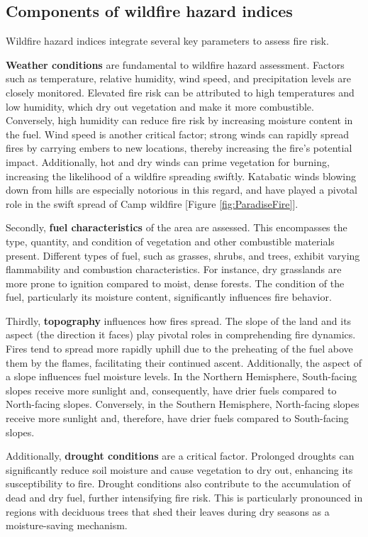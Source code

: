 \documentclass[
  12 pt,
]{Nemilov}
\begin{document}
\subsection{Components of wildfire hazard indices}\label{components-of-wildfire-hazard-indices}

Wildfire hazard indices integrate several key parameters to assess fire risk.

\textbf{Weather conditions} are fundamental to wildfire hazard assessment. Factors such as temperature, relative humidity, wind speed, and precipitation levels are closely monitored. Elevated fire risk can be attributed to high temperatures and low humidity, which dry out vegetation and make it more combustible. Conversely, high humidity can reduce fire risk by increasing moisture content in the fuel. Wind speed is another critical factor; strong winds can rapidly spread fires by carrying embers to new locations, thereby increasing the fire's potential impact. Additionally, hot and dry winds can prime vegetation for burning, increasing the likelihood of a wildfire spreading swiftly. Katabatic winds blowing down from hills are especially notorious in this regard, and have played a pivotal role in the swift spread of Camp wildfire {[}Figure \ref{fig:ParadiseFire}{]}.

Secondly, \textbf{fuel characteristics} of the area are assessed. This encompasses the type, quantity, and condition of vegetation and other combustible materials present. Different types of fuel, such as grasses, shrubs, and trees, exhibit varying flammability and combustion characteristics. For instance, dry grasslands are more prone to ignition compared to moist, dense forests. The condition of the fuel, particularly its moisture content, significantly influences fire behavior.

Thirdly, \textbf{topography} influences how fires spread. The slope of the land and its aspect (the direction it faces) play pivotal roles in comprehending fire dynamics. Fires tend to spread more rapidly uphill due to the preheating of the fuel above them by the flames, facilitating their continued ascent. Additionally, the aspect of a slope influences fuel moisture levels. In the Northern Hemisphere, South-facing slopes receive more sunlight and, consequently, have drier fuels compared to North-facing slopes. Conversely, in the Southern Hemisphere, North-facing slopes receive more sunlight and, therefore, have drier fuels compared to South-facing slopes.

Additionally, \textbf{drought conditions} are a critical factor. Prolonged droughts can significantly reduce soil moisture and cause vegetation to dry out, enhancing its susceptibility to fire. Drought conditions also contribute to the accumulation of dead and dry fuel, further intensifying fire risk. This is particularly pronounced in regions with deciduous trees that shed their leaves during dry seasons as a moisture-saving mechanism.
\end{document}
